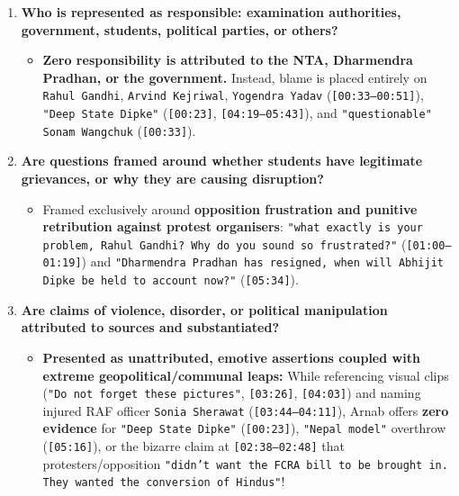 \documentclass[10pt,a4paper]{article}
\begin{document}
\begin{enumerate}[leftmargin=1.6em, itemsep=4pt, topsep=4pt]
  \begin{itemize}[leftmargin=1.4em, itemsep=2pt, topsep=2pt]
    \item \textbf{Zero words on the NEET paper leak itself!} The word \texttt{"NEET"} or \texttt{"paper leak"} does not appear \textit{even once} in the spoken transcript (\texttt{[00:00--06:41]}). 100\% of the monologue focuses on (a) mocking Rahul Gandhi (\texttt{[00:00--02:56]}) and (b) inciting permanent nationalist fury over street violence against police/RAF (\texttt{[03:06--06:38]}).
  \end{itemize}
  \item \textbf{Who is represented as responsible: examination authorities, government, students, political parties, or others?}
  \begin{itemize}[leftmargin=1.4em, itemsep=2pt, topsep=2pt]
    \item \textbf{Zero responsibility is attributed to the NTA, Dharmendra Pradhan, or the government.} Instead, blame is placed entirely on \texttt{Rahul Gandhi}, \texttt{Arvind Kejriwal}, \texttt{Yogendra Yadav} (\texttt{[00:33--00:51]}), \texttt{"Deep State Dipke"} (\texttt{[00:23]}, \texttt{[04:19--05:43]}), and \texttt{"questionable"} \texttt{Sonam Wangchuk} (\texttt{[00:33]}).
  \end{itemize}
  \item \textbf{Are questions framed around whether students have legitimate grievances, or why they are causing disruption?}
  \begin{itemize}[leftmargin=1.4em, itemsep=2pt, topsep=2pt]
    \item Framed exclusively around \textbf{opposition frustration and punitive retribution against protest organisers}: \texttt{"what exactly is your problem, Rahul Gandhi? Why do you sound so frustrated?"} (\texttt{[01:00--01:19]}) and \texttt{"Dharmendra Pradhan has resigned, when will Abhijit Dipke be held to account now?"} (\texttt{[05:34]}).
  \end{itemize}
  \item \textbf{Are claims of violence, disorder, or political manipulation attributed to sources and substantiated?}
  \begin{itemize}[leftmargin=1.4em, itemsep=2pt, topsep=2pt]
    \item \textbf{Presented as unattributed, emotive assertions coupled with extreme geopolitical/communal leaps:} While referencing visual clips (\texttt{"Do not forget these pictures"}, \texttt{[03:26]}, \texttt{[04:03]}) and naming injured RAF officer \texttt{Sonia Sherawat} (\texttt{[03:44--04:11]}), Arnab offers \textbf{zero evidence} for \texttt{"Deep State Dipke"} (\texttt{[00:23]}), \texttt{"Nepal model"} overthrow (\texttt{[05:16]}), or the bizarre claim at \texttt{[02:38--02:48]} that protesters/opposition \texttt{"didn't want the FCRA bill to be brought in. They wanted the conversion of Hindus"}!

\end{itemize}
\end{enumerate}
\end{document}
